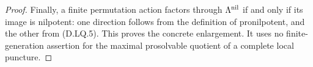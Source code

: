 \begin{proof}
Finally, a finite permutation action factors through
$\Lambda^{\rm nil}$ if and only if its image is nilpotent:
one direction follows from the definition of pronilpotent, and
the other from (D.LQ.5). This proves the concrete enlargement.
It uses no finite-generation assertion for the maximal
prosolvable quotient of a complete local puncture.
\end{proof}
